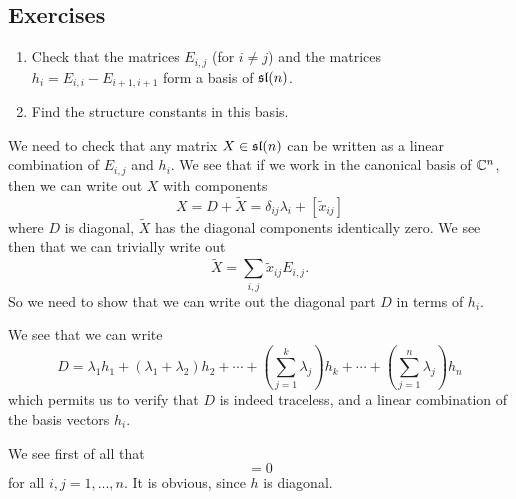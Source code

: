 \subsection{Exercises}
\begin{exercise}
\begin{enumerate}
\item Check that the matrices $E_{i,j}$ (for $i\not=j$) and the matrices $h_{i}=E_{i,i}-E_{i+1,i+1}$ form a basis of $\frak{sl}(n)$.
\item Find the structure constants in this basis.
\end{enumerate}
\end{exercise}

We need to check that any matrix $X\in\frak{sl}(n)$ can be
written as a linear combination of $E_{i,j}$ and $h_{i}$. We see
that if we work in the canonical basis of $\Bbb{C}^{n}$, then we
can write out $X$ with components
\begin{equation}
X=D+\widetilde{X}=\delta_{ij}\lambda_{i}+[\widetilde{x}_{ij}]
\end{equation}
where $D$ is diagonal, $\widetilde{X}$ has the diagonal
components identically zero. We see then that we can trivially
write out
\begin{equation}
\widetilde{X}=\sum_{i,j}\widetilde{x}_{ij}E_{i,j}.
\end{equation}
So we need to show that we can write out the diagonal part $D$ in
terms of $h_{i}$.

We see that we can write
\begin{equation}
D = \lambda_{1}h_{1}+(\lambda_{1}+\lambda_{2})h_{2}+\cdots+(\sum^{k}_{j=1}\lambda_{j})h_{k}+\cdots+(\sum^{n}_{j=1}\lambda_{j})h_{n}
\end{equation}
which permits us to verify that $D$ is indeed traceless, and a
linear combination of the basis vectors $h_{i}$.

We see first of all that
\begin{equation}
[h_{i},h_{j}]=0
\end{equation}
for all $i,j=1,...,n$. It is obvious, since $h$ is diagonal.

